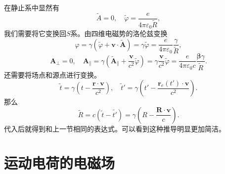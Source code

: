 \documentclass[UTF8]{ctexbook}
\renewcommand{\b}{\boldsymbol}
\numberwithin{equation}{chapter}
\begin{document}
	在静止系中显然有
	\[\tilde{A}=0,\quad \tilde{\varphi}=\frac{e}{4\pi \varepsilon_0 \tilde{R}},\]
	我们需要将它变换回$S$系。由四维电磁势的洛伦兹变换
	\[\varphi=\gamma(\tilde{\varphi}+\b{v}\cdot\tilde{\b{A}})=\gamma\tilde{\varphi}=\frac{e}{4\pi\varepsilon_0}\frac{\gamma}{\tilde{R}},\]
	\[\b{A}_\perp=0,\quad \b{A}_\parallel=\gamma\left(\tilde{\b{A}}_\parallel+\frac{\b{v}}{c^2}\tilde{\varphi}\right)=\gamma \frac{\b{v}}{c^2}\tilde{\varphi}=\frac{e}{4\pi\varepsilon_0c}\frac{\b{\beta}\gamma}{\tilde{R}}.\]
	还需要将场点和源点进行变换。
	\[\tilde{t}=\gamma\left(t-\frac{\b{r}\cdot\b{v}}{c^2}\right),\quad \tilde{t}'=\gamma\left(t'-\frac{\b{r}_e(t')\cdot\b{v}}{c^2}\right).\]
	那么
	\[\tilde{R}=c(\tilde{t}-\tilde{t'})=\gamma\left(R-\frac{\b{R}\cdot\b{v}}{c}\right).\]
	代入后就得到和上一节相同的表达式。可以看到这种推导明显更加简洁。
	
	\section{运动电荷的电磁场}
	
\end{document}
